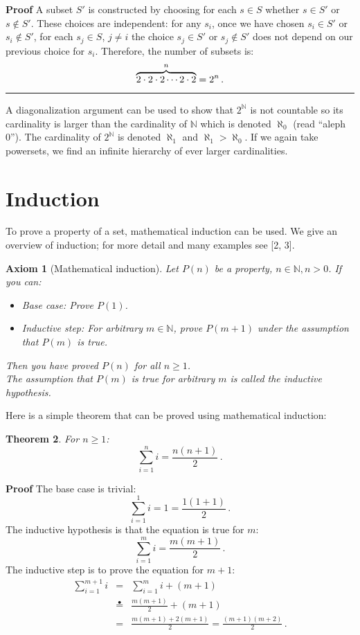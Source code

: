 \documentclass[12pt,a4paper]{article}
\newtheorem{theorem}{Theorem}
\newtheorem{axiom}[theorem]{Axiom}
\newcommand*{\ih}{\stackrel{\bullet}{=}}
\newcommand*{\qed}{\hfill\rule[-2pt]{4pt}{10pt}}
\newenvironment{proof}{\textbf{Proof}}{\qed}
\begin{document}
\begin{proof}
A subset $S'$ is constructed by choosing for each $s\in S$ whether $s\in S'$ or $s\not\in S'$. These choices are independent:  for any $s_i$, once we have chosen $s_i\in S'$ or $s_i\not\in S'$, for each $s_j\in S$, $j\neq i$ the choice $s_j\in S'$ or $s_j\not\in S'$ does not depend on our previous choice for $s_i$. Therefore, the number of subsets is:
\[
\overbrace{2\cdot 2\cdot 2 \cdots 2\cdot 2}^{n} = 2^n\,.
\vspace{-3ex}
\]
\end{proof}

A diagonalization argument can be used to show that $2^\mathbb{N}$ is not countable so its cardinality is larger than the cardinality of $\mathbb{N}$ which is denoted $\aleph_0$ (read ``aleph 0''). The cardinality of $2^\mathbb{N}$ is denoted $\aleph_1$ and $\aleph_1 >\aleph_0$. If we again take powersets, we find an infinite hierarchy of ever larger cardinalities.

\section{Induction}

To prove a property of a set, mathematical induction can be used. We give an overview of induction; for more detail and many examples see [2, 3].

\begin{axiom}[Mathematical induction]\label{ax.induction} Let $P(n)$ be a property, $n\in \mathbb{N}, n>0$. If you can:
\begin{itemize}
\item \emph{Base case}: Prove $P(1)$.
\item \emph{Inductive step}: For arbitrary $m\in \mathbb{N}$, prove $P(m+1)$ under the assumption that $P(m)$ is true.
\end{itemize}
Then you have proved $P(n)$ for all $n\geq 1$.\\
The assumption that $P(m)$ is true for arbitrary $m$ is called the \emph{inductive hypothesis}.
\end{axiom}
Here is a simple theorem that can be  proved using mathematical induction:
\begin{theorem}\label{t.sum}
For $n\geq 1$:
\[
\sum_{i=1}^n i = \frac{n(n+1)}{2}\,.
\]
\end{theorem}

\textbf{Proof} The base case is trivial:
\[
\sum_{i=1}^1 i = 1 =\frac{1(1+1)}{2}\,.
\]
The inductive hypothesis is that the equation is true for $m$:
\[
\sum_{i=1}^{m} i = \frac{m(m+1)}{2}\,.
\]
The inductive step is to prove the equation for $m+1$:
\begin{eqnarray}
\sum_{i=1}^{m+1} i &=& \sum_{i=1}^m i + (m+1)\label{l.sum1}\\
&\ih{}&\frac{m(m+1)}{2} + (m+1)\label{l.sum2}\\
&=&\frac{m(m+1) + 2(m+1)}{2}=\frac{(m+1)(m+2)}{2}\,.\label{l.sum3}
\end{eqnarray}
\end{document}
